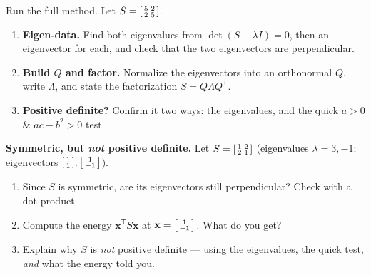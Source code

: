 \documentclass[10pt]{article}
\newcommand{\xx}{\mathbf{x}}
\newcommand{\T}{\mathsf{T}}
\begin{document}
\begin{tcolorbox}[colback=white, colframe=black!40, title=\textbf{Tier A --- Approaching Proficiency},
    fonttitle=\bfseries, arc=1.5mm, left=3mm, right=3mm, top=2mm, bottom=2mm, breakable]
Run the full method. Let $S=\begin{bsmallmatrix} 5 & 2\\ 2 & 5 \end{bsmallmatrix}$.
\begin{enumerate}[leftmargin=1.7em, itemsep=9pt]
  \item \textbf{Eigen-data.} Find both eigenvalues from $\det(S-\lambda I)=0$, then an eigenvector for each,
        and check that the two eigenvectors are perpendicular. 
  \item \textbf{Build $Q$ and factor.} Normalize the eigenvectors into an orthonormal $Q$, write $\Lambda$,
        and state the factorization $S=Q\Lambda Q^{\T}$. 
  \item \textbf{Positive definite?} Confirm it two ways: the eigenvalues, and the quick $a>0$ \& $ac-b^2>0$ test. \writeline
\end{enumerate}
\end{tcolorbox}

\begin{tcolorbox}[colback=white, colframe=black!40, title=\textbf{Tier E --- Extension},
    fonttitle=\bfseries, arc=1.5mm, left=3mm, right=3mm, top=2mm, bottom=2mm, breakable]
\textbf{Symmetric, but \emph{not} positive definite.} Let $S=\begin{bsmallmatrix} 1 & 2\\ 2 & 1 \end{bsmallmatrix}$
(eigenvalues $\lambda=3,-1$; eigenvectors $\begin{bsmallmatrix}1\\1\end{bsmallmatrix},\begin{bsmallmatrix}1\\-1\end{bsmallmatrix}$).
\begin{enumerate}[leftmargin=1.7em, itemsep=9pt]
  \item Since $S$ is symmetric, are its eigenvectors still perpendicular? Check with a dot product. \writeline
  \item Compute the energy $\xx^{\T}S\xx$ at $\xx=\begin{bsmallmatrix}1\\-1\end{bsmallmatrix}$. What do you get? \writeline
  \item Explain why $S$ is \emph{not} positive definite --- using the eigenvalues, the quick test, \emph{and}
        what the energy told you. 
\end{enumerate}
\end{tcolorbox}
\end{document}
